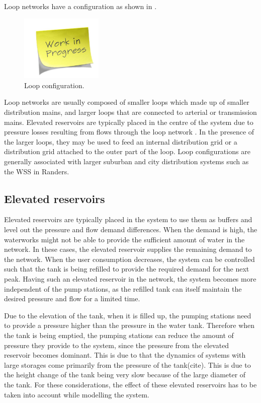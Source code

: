 Loop networks have a configuration as shown in . 

\begin{figure}[H]
\centering
\includegraphics[width=0.35\textwidth]{report/pictures/missingfigure}
\caption{Loop configuration.}
\label{fig:loop_configuration}
\end{figure}

Loop networks are usually composed of smaller loops which made up of smaller distribution mains, and larger loops that are connected to arterial or transmission mains. Elevated reservoirs are typically placed in the centre of the system due to pressure losses resulting from flows through the loop network \cite{council2007drinking}. In the presence of the larger loops, they may be used to feed an internal distribution grid or a distribution grid attached to the outer part of the loop. Loop configurations are generally associated with larger suburban and city distribution systems such as the WSS in Randers\cite{council2007drinking}. 

\subsection{Elevated reservoirs}
\label{elevated_reservoirs}

Elevated reservoirs are typically placed in the system to use them as buffers and level out the pressure and flow demand differences. When the demand is high, the waterworks might not be able to provide the sufficient amount of water in the network. In these cases, the elevated reservoir supplies the remaining demand to the network. When the user consumption decreases, the system can be controlled such that the tank is being refilled to provide the required demand for the next peak. Having such an elevated reservoir in the network, the system becomes more independent of the pump stations, as the refilled tank can itself maintain the desired pressure and flow for a limited time. 

Due to the elevation of the tank, when it is filled up, the pumping stations need to provide a pressure higher than the pressure in the water tank. Therefore when the tank is being emptied, the pumping stations can reduce the amount of pressure they provide to the system, since the pressure from the elevated reservoir becomes dominant. This is due to that the dynamics of systems with large storages come primarily from the pressure of the tank(cite). This is due to the height change of the tank being very slow because of the large diameter of the tank. For these considerations, the effect of these elevated reservoirs has to be taken into account while modelling the system. 

